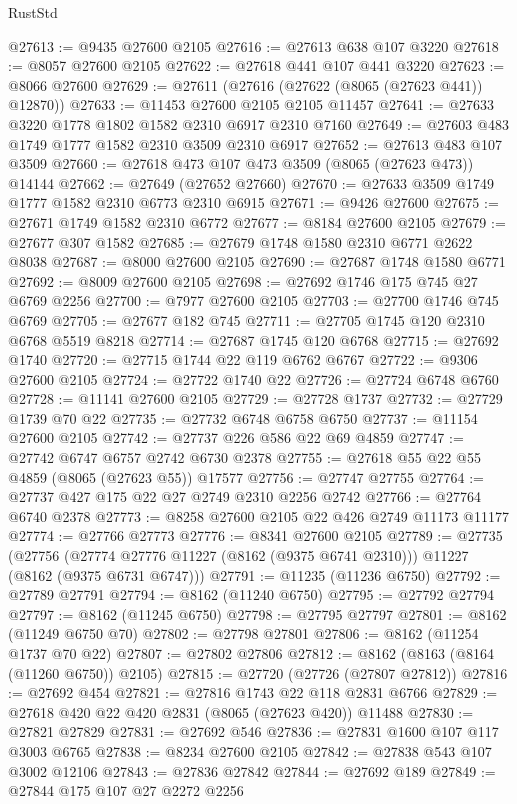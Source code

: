 \begin{lexlean}{RustStd}
\begin{coremodule}
@27613 := @9435 @27600 @2105
@27616 := @27613 @638 @107 @3220
@27618 := @8057 @27600 @2105
@27622 := @27618 @441 @107 @441 @3220
@27623 := @8066 @27600
@27629 := @27611 (@27616 (@27622 (@8065 (@27623 @441)) @12870))
@27633 := @11453 @27600 @2105 @2105 @11457
@27641 := @27633 @3220 @1778 @1802 @1582 @2310 @6917 @2310 @7160
@27649 := @27603 @483 @1749 @1777 @1582 @2310 @3509 @2310 @6917
@27652 := @27613 @483 @107 @3509
@27660 := @27618 @473 @107 @473 @3509 (@8065 (@27623 @473)) @14144
@27662 := @27649 (@27652 @27660)
@27670 := @27633 @3509 @1749 @1777 @1582 @2310 @6773 @2310 @6915
@27671 := @9426 @27600
@27675 := @27671 @1749 @1582 @2310 @6772
@27677 := @8184 @27600 @2105
@27679 := @27677 @307 @1582
@27685 := @27679 @1748 @1580 @2310 @6771 @2622 @8038
@27687 := @8000 @27600 @2105
@27690 := @27687 @1748 @1580 @6771
@27692 := @8009 @27600 @2105
@27698 := @27692 @1746 @175 @745 @27 @6769 @2256
@27700 := @7977 @27600 @2105
@27703 := @27700 @1746 @745 @6769
@27705 := @27677 @182 @745
@27711 := @27705 @1745 @120 @2310 @6768 @5519 @8218
@27714 := @27687 @1745 @120 @6768
@27715 := @27692 @1740
@27720 := @27715 @1744 @22 @119 @6762 @6767
@27722 := @9306 @27600 @2105
@27724 := @27722 @1740 @22
@27726 := @27724 @6748 @6760
@27728 := @11141 @27600 @2105
@27729 := @27728 @1737
@27732 := @27729 @1739 @70 @22
@27735 := @27732 @6748 @6758 @6750
@27737 := @11154 @27600 @2105
@27742 := @27737 @226 @586 @22 @69 @4859
@27747 := @27742 @6747 @6757 @2742 @6730 @2378
@27755 := @27618 @55 @22 @55 @4859 (@8065 (@27623 @55)) @17577
@27756 := @27747 @27755
@27764 := @27737 @427 @175 @22 @27 @2749 @2310 @2256 @2742
@27766 := @27764 @6740 @2378
@27773 := @8258 @27600 @2105 @22 @426 @2749 @11173 @11177
@27774 := @27766 @27773
@27776 := @8341 @27600 @2105
@27789 := @27735
    (@27756 (@27774 @27776 @11227 (@8162 (@9375 @6741 @2310))) @11227 (@8162 (@9375 @6731 @6747)))
@27791 := @11235 (@11236 @6750)
@27792 := @27789 @27791
@27794 := @8162 (@11240 @6750)
@27795 := @27792 @27794
@27797 := @8162 (@11245 @6750)
@27798 := @27795 @27797
@27801 := @8162 (@11249 @6750 @70)
@27802 := @27798 @27801
@27806 := @8162 (@11254 @1737 @70 @22)
@27807 := @27802 @27806
@27812 := @8162 (@8163 (@8164 (@11260 @6750)) @2105)
@27815 := @27720 (@27726 (@27807 @27812))
@27816 := @27692 @454
@27821 := @27816 @1743 @22 @118 @2831 @6766
@27829 := @27618 @420 @22 @420 @2831 (@8065 (@27623 @420)) @11488
@27830 := @27821 @27829
@27831 := @27692 @546
@27836 := @27831 @1600 @107 @117 @3003 @6765
@27838 := @8234 @27600 @2105
@27842 := @27838 @543 @107 @3002 @12106
@27843 := @27836 @27842
@27844 := @27692 @189
@27849 := @27844 @175 @107 @27 @2272 @2256

\end{coremodule}
\end{lexlean}

